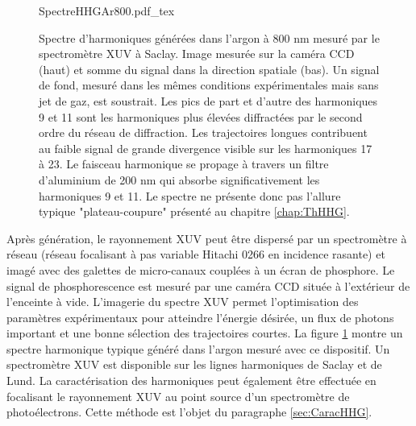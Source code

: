 \begin{figure}[ht]
\centering
\def\svgwidth{\columnwidth}
{SpectreHHGAr800.pdf_tex}
\caption{Spectre d'harmoniques générées dans l'argon à 800 nm mesuré par le spectromètre XUV à Saclay. Image mesurée sur la caméra CCD (haut) et somme du signal dans la direction spatiale (bas). Un signal de fond, mesuré dans les mêmes conditions expérimentales mais sans jet de gaz, est soustrait. Les pics de part et d'autre des harmoniques 9 et 11 sont les harmoniques plus élevées diffractées par le second ordre du réseau de diffraction. Les trajectoires longues contribuent au faible signal de grande divergence visible sur les harmoniques 17 à 23. Le faisceau harmonique se propage à travers un filtre d'aluminium de 200 nm qui absorbe significativement les harmoniques 9 et 11. Le spectre ne présente donc pas l'allure typique "plateau-coupure" présenté au chapitre \ref{chap:ThHHG}.}
\label{fig:SpectreAr800}
\end{figure}

Après génération, le rayonnement XUV peut être dispersé par un spectromètre à réseau (réseau focalisant à pas variable Hitachi 0266 en incidence rasante) et imagé avec des galettes de micro-canaux couplées à un écran de phosphore. Le signal de phosphorescence est mesuré par une caméra CCD située à l'extérieur de l'enceinte à vide. L'imagerie du spectre XUV permet l'optimisation des paramètres expérimentaux pour atteindre l'énergie désirée, un flux de photons important et une bonne sélection des trajectoires courtes. La figure \ref{fig:SpectreAr800} montre un spectre harmonique typique généré dans l'argon mesuré avec ce dispositif. Un spectromètre XUV est disponible sur les lignes harmoniques de Saclay et de Lund. La caractérisation des harmoniques peut également être effectuée en focalisant le rayonnement XUV au point source d'un spectromètre de photoélectrons. Cette méthode est l'objet du paragraphe \ref{sec:CaracHHG}.




